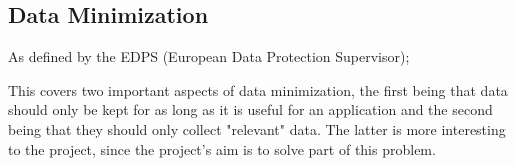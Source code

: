 
\subsection{Data Minimization}

As defined by the EDPS (European Data Protection Supervisor);  \cite{website:europa.eu}


This covers two important aspects of data minimization, the first being that data should only be kept for as long as it is useful for an application and the second being that they should only collect "relevant" data. The latter is more interesting to the project, since the project's aim is to solve part of this problem.



